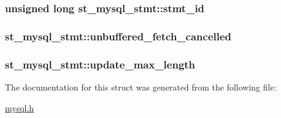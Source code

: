 \subsubsection[{stmt\+\_\+id}]{\setlength{\rightskip}{0pt plus 5cm}unsigned long st\+\_\+mysql\+\_\+stmt\+::stmt\+\_\+id}\label{structst__mysql__stmt_ad800f40b351919f8d6e9c9a4d757ab72}
\hypertarget{structst__mysql__stmt_aa0fee515cb67c6671540a12042362619}{}
\subsubsection[{unbuffered\+\_\+fetch\+\_\+cancelled}]{ st\+\_\+mysql\+\_\+stmt\+::unbuffered\+\_\+fetch\+\_\+cancelled}\label{structst__mysql__stmt_aa0fee515cb67c6671540a12042362619}
\hypertarget{structst__mysql__stmt_ab2e8f874563ad8a2d658117548983cf8}{}
\subsubsection[{update\+\_\+max\+\_\+length}]{ st\+\_\+mysql\+\_\+stmt\+::update\+\_\+max\+\_\+length}\label{structst__mysql__stmt_ab2e8f874563ad8a2d658117548983cf8}


The documentation for this struct was generated from the following file\+:\begin{DoxyCompactItemize}
\item 
\hyperlink{mysql_8h}{mysql.\+h}\end{DoxyCompactItemize}
